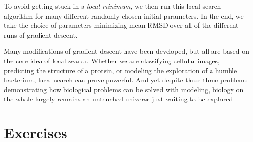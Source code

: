 \begin{qbox}\end{qbox}

To avoid getting stuck in a \textit{local minimum}, we then run this local search algorithm for many different randomly chosen initial parameters. In the end, we take the choice of parameters minimizing mean RMSD over all of the different runs of gradient descent.

Many modifications of gradient descent have been developed, but all are based on the core idea of local search. Whether we are classifying cellular images, predicting the structure of a protein, or modeling the exploration of a humble bacterium, local search can prove powerful. And yet despite these three problems demonstrating how biological problems can be solved with modeling, biology on the whole largely remains an untouched universe just waiting to be explored.

\FloatBarrier

\newpage
\section{Exercises}
\label{sec:exercises}

\begin{exercise}[%
The iris flower dataset has four features. Apply PCA to produce the iris flower dataset with dimension $d = 2$.
]\end{exercise}

\begin{exercise}\end{exercise}
